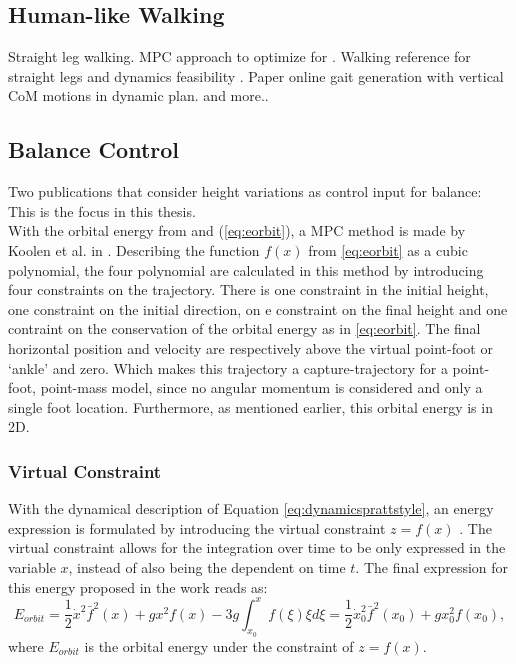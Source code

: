 \subsection{Human-like Walking}
Straight leg walking. MPC approach to optimize for \cite{brasseur2015robust}. Walking reference for straight legs and dynamics feasibility \cite{kajita2017biped}. Paper online gait generation with vertical \ac{CoM} motions in dynamic plan.\cite{kuo2005energetic} \cite{terada2007online}
\cite{you2016straight} \cite{griffin2018straight} and more.. \cite{lee1998determinants}
\subsection{Balance Control}\label{subsec:heightbalance}
Two publications that consider height variations as control input for balance:
\cite{koolen2016balance} \cite{caron2018capturability}\cite{gao2017increase}
This is the focus in this thesis.\\
With the  orbital energy from \cite{pratt2007derivation} and (\eqref{eq:eorbit}), a \ac{MPC} method is made by Koolen et al. in \cite{koolen2016balance}. Describing the function $f(x)$ from \eqref{eq:eorbit} as a cubic polynomial, the four polynomial are calculated in this method by introducing four constraints on the trajectory. There is one constraint in the initial height, one constraint on the initial direction, on e constraint on the final height and one contraint on the conservation of the orbital energy as in \eqref{eq:eorbit}. The final horizontal position and velocity are respectively above the virtual point-foot or `ankle' and zero. Which makes this trajectory a capture-trajectory for a point-foot, point-mass model, since no angular momentum is considered and only a single foot location. Furthermore, as mentioned earlier, this orbital energy is in \ac{2D}.\\

\subsubsection{Virtual Constraint}
With the dynamical description of Equation \eqref{eq:dynamicsprattstyle}, an energy expression is formulated by introducing the virtual constraint $z=f(x)$ \cite{pratt2007derivation}. The virtual constraint allows for the integration over time to be only expressed in the variable $x$, instead of also being the dependent on time $t$. The final expression for this energy proposed in the work reads as:
\begin{equation}\label{eq:eorbit}
    E_{orbit}  = \frac{1}{2}\dot{x}^2\bar{f}^2(x)+gx^2f(x) - 3g\int_{x_0}^xf(\xi)\xi d\xi = \frac{1}{2}\dot{x}_0^2\bar{f}^2(x_0)+gx_0^2f(x_0),
\end{equation}
where $E_{orbit}$ is the orbital energy under the constraint of $z=f(x)$.

